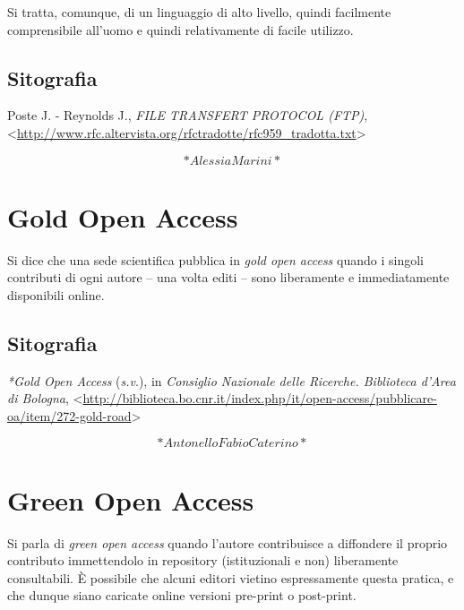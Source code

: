 \documentclass[
  b5paper,
  twoside,
  11pt,
  chapterprefix=false,
  bibliography=totocnumbered,
  parskip=0]{scrbook}
\begin{document}
Si tratta, comunque, di un linguaggio di alto livello, quindi facilmente
comprensibile all'uomo e quindi relativamente di facile utilizzo.

\hypertarget{sitografia-13}{%
\section*{Sitografia}\label{sitografia-13}}

Poste J. - Reynolds J., \emph{FILE TRANSFERT PROTOCOL (FTP)},
\textless{}\href{http://www.rfc.altervista.org/rfctradotte/rfc959_tradotta.txt}{{http://www.rfc.altervista.org/rfctradotte/rfc959\_tradotta.txt}}\textgreater{}

\[*Alessia Marini*\]

\hypertarget{gold-open-access}{%
\chapter{Gold Open Access}\label{gold-open-access}}

Si dice che una sede scientifica pubblica in \emph{gold open access} quando i
singoli contributi di ogni autore -- una volta editi -- sono liberamente
e immediatamente disponibili online.

\hypertarget{sitografia-14}{%
\section*{Sitografia}\label{sitografia-14}}

\emph{*Gold Open Access} (\emph{s.v}.), in \emph{Consiglio Nazionale delle Ricerche.
Biblioteca d'Area di Bologna},
\textless{}{\url{http://biblioteca.bo.cnr.it/index.php/it/open-access/pubblicare-oa/item/272-gold-road}\textgreater{}}

\[*Antonello Fabio Caterino*\]

\hypertarget{green-open-access}{%
\chapter{Green Open Access}\label{green-open-access}}

Si parla di \emph{green open access} quando l'autore contribuisce a
diffondere il proprio contributo immettendolo in repository
(istituzionali e non) liberamente consultabili. È possibile che alcuni
editori vietino espressamente questa pratica, e che dunque siano
caricate online versioni pre-print o post-print.
\end{document}
